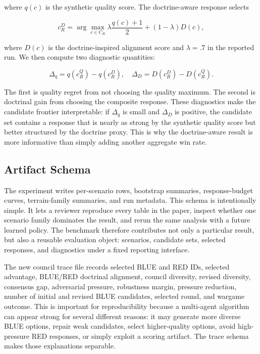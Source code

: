 \documentclass[letterpaper]{article}
\begin{document}
where $q(c)$ is the synthetic quality score. The doctrine-aware response selects

\begin{equation}
c_R^D = \arg\max_{c \in C_R} \lambda \frac{q(c)+1}{2} + (1-\lambda)D(c),
\end{equation}

where $D(c)$ is the doctrine-inspired alignment score and $\lambda=.7$ in the reported run. We then compute two diagnostic quantities:

\begin{equation}
\Delta_q = q(c_R^Q) - q(c_R^D), \quad
\Delta_D = D(c_R^D) - D(c_R^Q).
\end{equation}

The first is quality regret from not choosing the quality maximum. The second is doctrinal gain from choosing the composite response. These diagnostics make the candidate frontier interpretable: if $\Delta_q$ is small and $\Delta_D$ is positive, the candidate set contains a response that is nearly as strong by the synthetic quality score but better structured by the doctrine proxy. This is why the doctrine-aware result is more informative than simply adding another aggregate win rate.

\subsection{Artifact Schema}

The experiment writes per-scenario rows, bootstrap summaries, response-budget curves, terrain-family summaries, and run metadata. This schema is intentionally simple. It lets a reviewer reproduce every table in the paper, inspect whether one scenario family dominates the result, and rerun the same analysis with a future learned policy. The benchmark therefore contributes not only a particular result, but also a reusable evaluation object: scenarios, candidate sets, selected responses, and diagnostics under a fixed reporting interface.

The new council trace file records selected BLUE and RED IDs, selected advantage, BLUE/RED doctrinal alignment, council diversity, revised diversity, consensus gap, adversarial pressure, robustness margin, pressure reduction, number of initial and revised BLUE candidates, selected round, and wargame outcome. This is important for reproducibility because a multi-agent algorithm can appear strong for several different reasons: it may generate more diverse BLUE options, repair weak candidates, select higher-quality options, avoid high-pressure RED responses, or simply exploit a scoring artifact. The trace schema makes those explanations separable.
\end{document}
